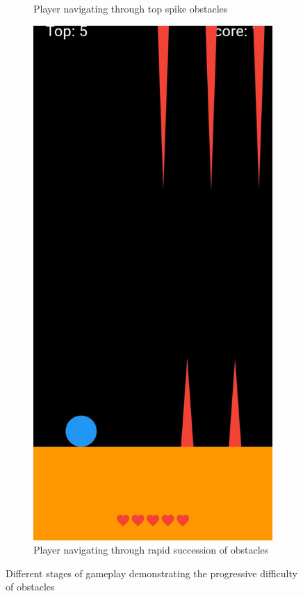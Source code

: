 \documentclass[runningheads]{llncs}
\begin{document}
\begin{figure}[h]
\begin{subfigure}{0.3\textwidth}
        \caption{Player navigating through top spike obstacles}
        \label{fig:gameplay2}
    \end{subfigure}
    \hfill
    \begin{subfigure}{0.3\textwidth}
        \centering
        \includegraphics[width=\linewidth]{figures/obstacles_many.jpg}
        \caption{Player navigating through rapid succession of obstacles}
        \label{fig:gameplay3}
    \end{subfigure}
    \caption{Different stages of gameplay demonstrating the progressive difficulty of obstacles}
    \label{fig:gameplay_stages}
\end{figure}
\end{document}
